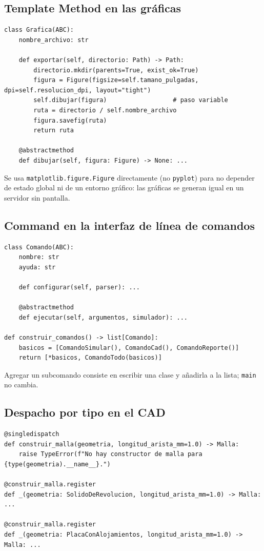\documentclass[11pt]{article}
\begin{document}
\subsection{Template Method en las gráficas}
\begin{lstlisting}[style=python]
class Grafica(ABC):
    nombre_archivo: str

    def exportar(self, directorio: Path) -> Path:
        directorio.mkdir(parents=True, exist_ok=True)
        figura = Figure(figsize=self.tamano_pulgadas, dpi=self.resolucion_dpi, layout="tight")
        self.dibujar(figura)                  # paso variable
        ruta = directorio / self.nombre_archivo
        figura.savefig(ruta)
        return ruta

    @abstractmethod
    def dibujar(self, figura: Figure) -> None: ...
\end{lstlisting}
Se usa \texttt{matplotlib.figure.Figure} directamente (no \texttt{pyplot}) para no depender de estado global ni de
un entorno gráfico: las gráficas se generan igual en un servidor sin pantalla.

\subsection{Command en la interfaz de línea de comandos}
\begin{lstlisting}[style=python]
class Comando(ABC):
    nombre: str
    ayuda: str

    def configurar(self, parser): ...

    @abstractmethod
    def ejecutar(self, argumentos, simulador): ...

def construir_comandos() -> list[Comando]:
    basicos = [ComandoSimular(), ComandoCad(), ComandoReporte()]
    return [*basicos, ComandoTodo(basicos)]
\end{lstlisting}
Agregar un subcomando consiste en escribir una clase y añadirla a la lista; \texttt{main} no cambia.

\subsection{Despacho por tipo en el CAD}
\begin{lstlisting}[style=python]
@singledispatch
def construir_malla(geometria, longitud_arista_mm=1.0) -> Malla:
    raise TypeError(f"No hay constructor de malla para {type(geometria).__name__}.")

@construir_malla.register
def _(geometria: SolidoDeRevolucion, longitud_arista_mm=1.0) -> Malla: ...

@construir_malla.register
def _(geometria: PlacaConAlojamientos, longitud_arista_mm=1.0) -> Malla: ...
\end{lstlisting}
\end{document}
